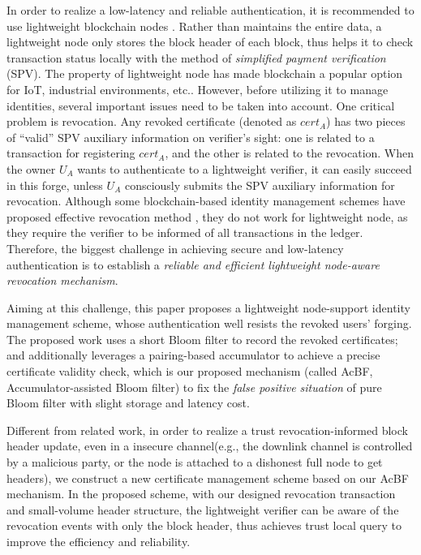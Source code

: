 \documentclass[conference]{IEEEtran}
\begin{document}
In order to realize a low-latency and reliable authentication, it is recommended to use lightweight blockchain nodes \cite{smartdid}.
Rather than maintains the entire data, a lightweight node only stores the block header of each block, thus helps it to check transaction status locally with the method of \textit{simplified payment verification} (SPV).
The property of lightweight node has made blockchain a popular option for IoT, industrial environments, etc.. However, before utilizing it to manage identities, several important issues need to be taken into account. One critical problem is revocation. Any revoked certificate (denoted as $cert_A$) has two pieces of ``valid'' SPV auxiliary information on verifier's sight: one is related to a transaction for registering $cert_A$, and the other is related to the revocation. 
When the owner $U_A$ wants to authenticate to a lightweight verifier, it can easily succeed in this forge, unless $U_A$ consciously submits the SPV auxiliary information for revocation. Although some blockchain-based identity management schemes have proposed effective revocation method \cite{luoScalaCertScalabilityOrientedPKI2022a,  wang2020blockchain,jiaRedactableBlockchainDecentralized2022,chenCertchainPublicEfficient2018a}, they do not work for lightweight node, as they require the verifier to be informed of all transactions in the ledger. Therefore, the biggest challenge in achieving secure and low-latency authentication is to establish a \textit{reliable and efficient lightweight node-aware revocation mechanism}.

Aiming at this challenge, this paper proposes a lightweight node-support identity management scheme, whose authentication well resists the revoked users' forging. The proposed work uses a short Bloom filter to record the revoked certificates; and additionally leverages a pairing-based accumulator to achieve a precise certificate validity check, which is our proposed mechanism (called AcBF, Accumulator-assisted Bloom filter) to fix the \textit{false positive situation} of pure Bloom filter with slight storage and latency cost. 

Different from related work, in order to realize a trust revocation-informed block header update, even in a insecure channel(e.g., the downlink channel is controlled by a malicious party, or the node is attached to a dishonest full node to get headers), we construct a new certificate management scheme based on our AcBF mechanism. In the proposed scheme, with our designed revocation transaction and small-volume header structure, the lightweight verifier can be aware of the revocation events with only the block header, thus achieves trust local query to improve the efficiency and reliability. 
\end{document}
